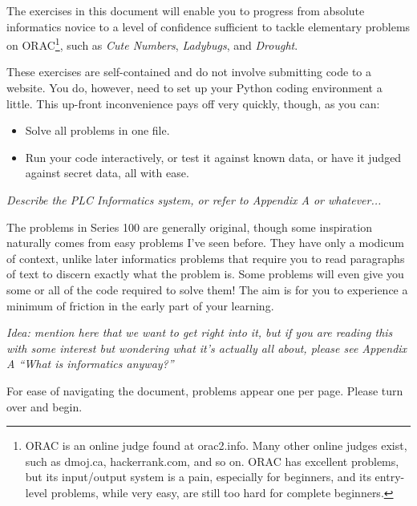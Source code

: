 

The exercises in this document will enable you to progress from absolute informatics
novice to a level of confidence sufficient to tackle elementary problems on
ORAC\footnote{ORAC is an online judge found at orac2.info. Many other online judges exist,
such as dmoj.ca, hackerrank.com, and so on. ORAC has excellent problems, but its
input/output system is a pain, especially for beginners, and its entry-level problems,
while very easy, are still too hard for complete beginners.}, such as \emph{Cute Numbers},
\emph{Ladybugs}, and \emph{Drought}.

These exercises are self-contained and do not involve submitting code to a website. You
do, however, need to set up your Python coding environment a little. This up-front
inconvenience pays off very quickly, though, as you can:
\begin{itemize}
  \item Solve all problems in one file.
  \item Run your code interactively, or test it against known data, or have it judged
    against secret data, all with ease.
\end{itemize}

\emph{Describe the PLC Informatics system, or refer to Appendix A or whatever...}

The problems in Series 100 are generally original, though some inspiration naturally comes
from easy problems I've seen before. They have only a modicum of context, unlike later
informatics problems that require you to read paragraphs of text to discern exactly what
the problem is. Some problems will even give you some or all of the code required to solve
them! The aim is for you to experience a minimum of friction in the early part of your
learning.

\emph{Idea: mention here that we want to get right into it, but if you are reading this
with some interest but wondering what it's actually all about, please see Appendix A
``What is informatics anyway?''}

For ease of navigating the document, problems appear one per page. Please turn over and
begin.

